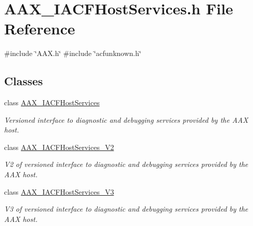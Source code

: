 \hypertarget{a00542}{}\section{A\+A\+X\+\_\+\+I\+A\+C\+F\+Host\+Services.\+h File Reference}
\label{a00542}
{\ttfamily \#include \char`\"{}A\+A\+X.\+h\char`\"{}}\newline
{\ttfamily \#include \char`\"{}acfunknown.\+h\char`\"{}}\newline
\subsection*{Classes}
\begin{DoxyCompactItemize}
\item 
class \mbox{\hyperlink{a01713}{A\+A\+X\+\_\+\+I\+A\+C\+F\+Host\+Services}}
\begin{DoxyCompactList}\small\item\em Versioned interface to diagnostic and debugging services provided by the A\+AX host. \end{DoxyCompactList}\item 
class \mbox{\hyperlink{a01717}{A\+A\+X\+\_\+\+I\+A\+C\+F\+Host\+Services\+\_\+\+V2}}
\begin{DoxyCompactList}\small\item\em V2 of versioned interface to diagnostic and debugging services provided by the A\+AX host. \end{DoxyCompactList}\item 
class \mbox{\hyperlink{a01721}{A\+A\+X\+\_\+\+I\+A\+C\+F\+Host\+Services\+\_\+\+V3}}
\begin{DoxyCompactList}\small\item\em V3 of versioned interface to diagnostic and debugging services provided by the A\+AX host. \end{DoxyCompactList}\end{DoxyCompactItemize}
